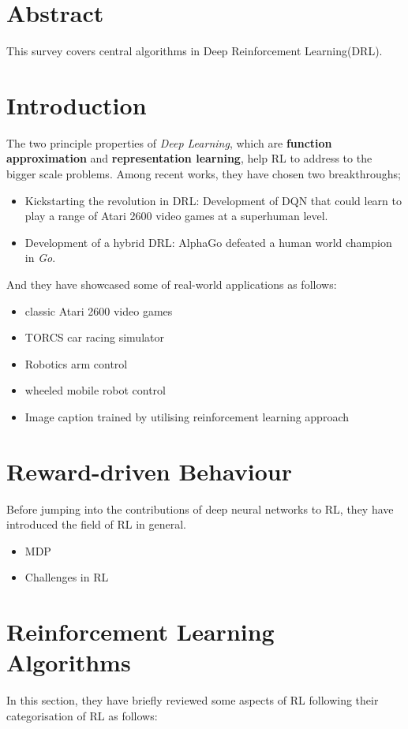 \documentclass{article}
\begin{document}
\section{Abstract}
This survey covers central algorithms in Deep Reinforcement Learning(DRL).

\section{Introduction}
The two principle properties of \textit{Deep Learning}, which are \textbf{function approximation} and \textbf{representation learning}, help RL to address to the bigger scale problems. Among recent works, they have chosen two breakthroughs;

\begin{itemize}
    \item Kickstarting the revolution in DRL: Development of DQN that could learn to play a range of Atari 2600 video games at a superhuman level.
    \item Development of a hybrid DRL: AlphaGo defeated a human world champion in \textit{Go}.
\end{itemize}
And they have showcased some of real-world applications as follows:

\begin{itemize}
    \item classic Atari 2600 video games
    \item TORCS car racing simulator
    \item Robotics arm control
    \item wheeled mobile robot control
    \item Image caption trained by utilising reinforcement learning approach
\end{itemize}

\section{Reward-driven Behaviour}
Before jumping into the contributions of deep neural networks to RL, they have introduced the field of RL in general.

\begin{itemize}
    \item MDP
    \item Challenges in RL
\end{itemize}

\section{Reinforcement Learning Algorithms}
In this section, they have briefly reviewed some aspects of RL following their categorisation of RL as follows:
\end{document}
